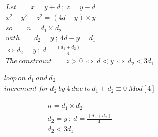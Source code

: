 \documentclass[10pt,a4paper]{letter}
\begin{document}

\begin{align*}
 & Let \qquad x = y+d \:;\: z=y-d \\
 & x^{2}-y^{2}-z^{2}= (4d-y) \times y\\
 & so \qquad n=d_{1} \times d_{2}\\
 & with \qquad d_{2}=y \:;\: 4d-y=d_{1}\\
 & \Leftrightarrow d_{2}=y \:;\: d=\frac{(d_{1}+d_{2})}{4}\\
 &The \: constraint \qquad z>0 \: \Leftrightarrow \: d<y \: \Leftrightarrow \: d_{2}<3d_{1}
\end{align*}

\begin{align*}
&loop \: on \: d_{1} \: and \:d_{2} \\
& increment \: for \:d_{2} \: by \:4 \:due\:to\:d_{1}+d_{2}\equiv0 \: Mod[4]
\end{align*}

\begin{align*}
  & n=d_{1} \times d_{2}\\
 & d_{2}=y \:;\: d=\frac{(d_{1}+d_{2})}{4}\\
 & d_{2}<3d_{1}
\end{align*}
\end{document}
